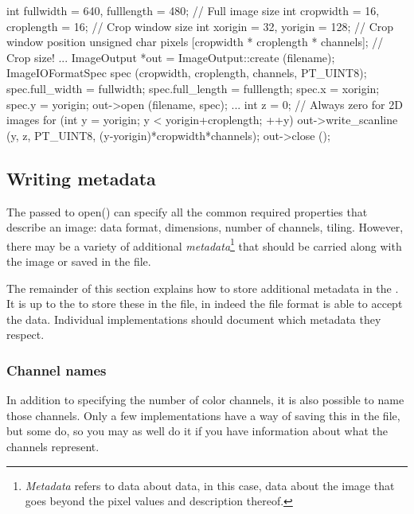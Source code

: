 \begin{code}
        int fullwidth = 640, fulllength = 480; // Full image size
        int cropwidth = 16, croplength = 16;  // Crop window size
        int xorigin = 32, yorigin = 128;      // Crop window position
        unsigned char pixels [cropwidth * croplength * channels]; // Crop size!
        ...
        ImageOutput *out = ImageOutput::create (filename);
        ImageIOFormatSpec spec (cropwidth, croplength, channels, PT_UINT8);
        spec.full_width = fullwidth;
        spec.full_length = fulllength;
        spec.x = xorigin;
        spec.y = yorigin;
        out->open (filename, spec);
        ...
        int z = 0;   // Always zero for 2D images
        for (int y = yorigin;  y < yorigin+croplength;  ++y) {
            out->write_scanline (y, z, PT_UINT8, (y-yorigin)*cropwidth*channels);
        }
        out->close ();
\end{code}


\subsection{Writing metadata}
\label{sec:imageoutput:metadata}

The \ImageIOFormatSpec passed to {\cf open()} can specify all the common
required properties that describe an image: data format, dimensions,
number of channels, tiling.  However, there may be a variety of
additional \emph{metadata}\footnote{\emph{Metadata} refers to data about
data, in this case, data about the image that goes beyond the pixel
values and description thereof.} that should be carried along with the
image or saved in the file.  

The remainder of this section explains how to store additional metadata
in the \ImageIOFormatSpec.  It is up to the \ImageOutput to store these
in the file, in indeed the file format is able to accept the data.
Individual \ImageOutput implementations should document which metadata
they respect.

\subsubsection{Channel names}

In addition to specifying the number of color channels, it is also
possible to name those channels.  Only a few \ImageOutput
implementations have a way of saving this in the file, but some do, so
you may as well do it if you have information about what the channels
represent.

